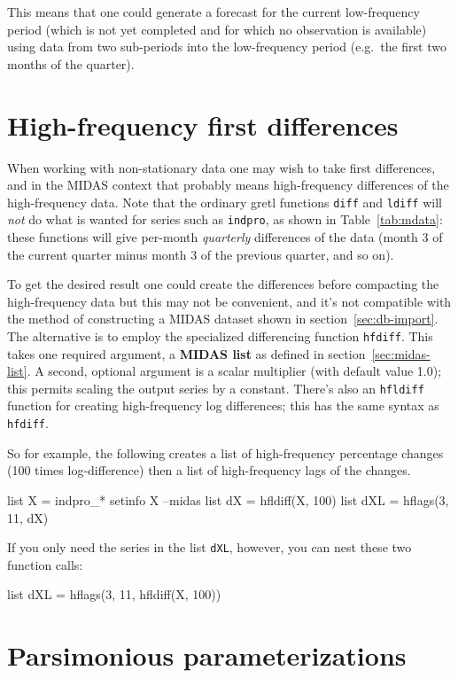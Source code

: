 \documentclass{article}
\begin{document}
This means that one could generate a forecast for the current
low-frequency period (which is not yet completed and for which no
observation is available) using data from two sub-periods into the
low-frequency period (e.g.\ the first two months of the quarter).

\section{High-frequency first differences}

When working with non-stationary data one may wish to take first
differences, and in the MIDAS context that probably means
high-frequency differences of the high-frequency data. Note that the
ordinary gretl functions \texttt{diff} and \texttt{ldiff} will
\textit{not} do what is wanted for series such as \texttt{indpro}, as
shown in Table~\ref{tab:mdata}: these functions will give per-month
\textit{quarterly} differences of the data (month 3 of the current
quarter minus month 3 of the previous quarter, and so on).

To get the desired result one could create the differences before
compacting the high-frequency data but this may not be convenient, and
it's not compatible with the method of constructing a MIDAS dataset
shown in section~\ref{sec:db-import}. The alternative is to employ the
specialized differencing function \texttt{hfdiff}. This takes one
required argument, a \textbf{MIDAS list} as defined in
section~\ref{sec:midas-list}. A second, optional argument is a scalar
multiplier (with default value 1.0); this permits scaling the output
series by a constant. There's also an \texttt{hfldiff} function for
creating high-frequency log differences; this has the same syntax as
\texttt{hfdiff}.

So for example, the following creates a list of high-frequency
percentage changes (100 times log-difference) then a list of
high-frequency lags of the changes.
%
\begin{code}
list X = indpro_*
setinfo X --midas
list dX = hfldiff(X, 100)
list dXL = hflags(3, 11, dX)
\end{code}

If you only need the series in the list \texttt{dXL}, however, you can
nest these two function calls:
%
\begin{code}
list dXL = hflags(3, 11, hfldiff(X, 100))
\end{code}

\section{Parsimonious parameterizations}
\label{sec:hparams}
\end{document}
